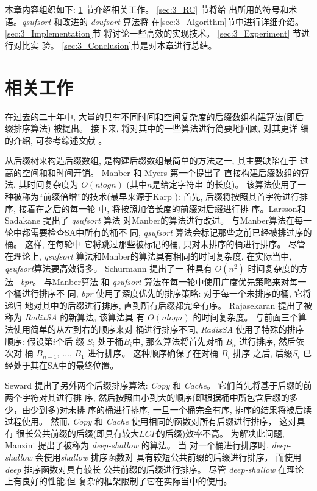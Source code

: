 本章内容组织如下: \ref{sec:3_RW} 节介绍相关工作。 \ref{sec:3_RC} 节将给
出所用的符号和术语。\emph{qsufsort} 和改进的 \emph{dsufsort} 算法将
在\ref{sec:3_Algorithm}节中进行详细介绍。 \ref{sec:3_Implementation}节
将讨论一些高效的实现技术。 \ref{sec:3_Experiment} 节进行对比实
验。 \ref{sec:3_Conclusion}节是对本章进行总结。

\section{相关工作}
\label{sec:3_RW}


在过去的二十年中, 大量的具有不同时间和空间复杂度的后缀数组构建算法(即后
缀排序算法) 被提出。 接下来, 将对其中的一些算法进行简要地回顾, 对其更详
细的介绍, 可参考综述文献 \cite{Puglisi2007} \cite{Dhaliwal2012}。

从后缀树来构造后缀数组, 是构建后缀数组最简单的方法之一, 其主要缺陷在于
过高的空间和和时间开销。 Manber 和 Myers \cite{Manber1993} 第一个提出了
直接构建后缀数组的算法, 其时间复杂度为 $O(nlogn)$ (其中$n$是给定字符串
的长度)。 该算法使用了一种被称为“前缀倍增”的技术(最早来源于Karp
\cite{Karp1972}): 首先, 后缀将按照其首字符进行排序, 接着在之后的每一轮
中, 将按照加倍长度的前缀对后缀进行排
序。Larsson和Sadakane\cite{Larsson2007} 提出了 \emph{qsufsort} 算法
对Manber的算法进行改进。 与Manber算法在每一轮中都需要检查SA中所有的桶不
同, \emph{qsufsort} 算法会标记那些之前已经被排过序的桶。 这样, 在每轮中
它将跳过那些被标记的桶, 只对未排序的桶进行排序。 尽管在理论上,
\emph{qsufsort} 算法和Manber的算法具有相同的时间复杂度, 在实际当中,
\emph{qsufsort}算法要高效得多。 Schurmann\cite{Schurmann2007} 提出了一
种具有 $O(n^2)$ 时间复杂度的方法-- \emph{bpr}。 与Manber算法
和 \emph{qsufsort} 算法在每一轮中使用广度优先策略来对每一个桶进行排序不
同, \emph{bpr} 使用了深度优先的排序策略: 对于每一个未排序的桶, 它将递归
地对其中的后缀进行排序, 直到所有后缀都完全有序。  Rajasekaran
\cite{Rajasekaran2014} 提出了被称为 \emph{RadixSA} 的新算法, 该算法具
有 $O(nlogn)$ 的时间复杂度。 与前面三个算法使用简单的从左到右的顺序来对
桶进行排序不同, \emph{RadixSA} 使用了特殊的排序顺序: 假设第$i$个后
缀 $S_i$ 处于桶$B_i$中, 那么算法将首先对桶 $B_n$ 进行排序, 然后依次对
桶 $B_{n-1},\,\dots,\, B_1$ 进行排序。 这种顺序确保了在对桶 $B_i$ 排序
之后, 后缀$S_i$ 已经处于其在SA中的最终位置。

Seward \cite{Seward2000} 提出了另外两个后缀排序算法:
\emph{Copy} 和 \emph{Cache}。 它们首先将基于后缀的前两个字符对其进行排
序, 然后按照由小到大的顺序(即根据桶中所包含后缀的多少，由少到多)对未排
序的桶进行排序, 一旦一个桶完全有序, 排序的结果将被后续过程使用。 然而,
\emph{Copy} 和 \emph{Cache} 使用相同的函数对所有后缀进行排序， 这对具有
很长公共前缀的后缀(即具有较大$LCP$的后缀)效率不高。 为解决此问题,
Manzini \cite{Manzini2004} 提出了被称为 \emph{deep-shallow} 的算法。 当
对一个桶进行排序时, \emph{deep-shallow} 会使用\emph{shallow} 排序函数对
具有较短公共前缀的后缀进行排序， 而使用 \emph{deep} 排序函数对具有较长
公共前缀的后缀进行排序。 尽管 \emph{deep-shallow} 在理论上有良好的性能,但
复杂的框架限制了它在实际当中的使用。

